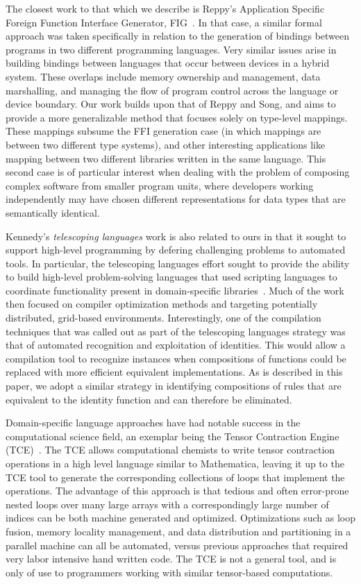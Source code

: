 The closest work to that which we describe is Reppy's Application
Specific Foreign Function Interface Generator,
FIG~\cite{reppy06fig}. In that case, a similar formal approach was
taken specifically in relation to the generation of bindings between
programs in two different programming languages.  Very similar issues
arise in building bindings between languages that occur between
devices in a hybrid system.  These overlaps include memory ownership
and management, data marshalling, and managing the flow of program
control across the language or device boundary.  Our work builds upon
that of Reppy and Song, and aims to provide a more generalizable
method that focuses solely on type-level mappings. These mappings
subsume the FFI generation case (in which mappings are between two
different type systems), and other interesting applications like
mapping between two different libraries written in the same
language. This second case is of particular interest when dealing with
the problem of composing complex software from smaller program units,
where developers working independently may have chosen different
representations for data types that are semantically identical.

Kennedy's \emph{telescoping languages} work is also related to ours in
that it sought to support high-level programming by defering
challenging problems to automated tools.  In particular, the
telescoping languages effort sought to provide the ability to build
high-level problem-solving languages that used scripting languages to
coordinate functionality present in domain-specific
libraries~\cite{kennedy00telescoping}. Much of the work then focused
on compiler optimization methods and targeting potentially
distributed, grid-based environments. Interestingly, one of the
compilation techniques that was called out as part of the telescoping
languages strategy was that of automated recognition and exploitation
of identities. This would allow a compilation tool to recognize
instances when compositions of functions could be replaced with more
efficient equivalent implementations. As is described in this paper,
we adopt a similar strategy in identifying compositions of rules that
are equivalent to the identity function and can therefore be
eliminated.

Domain-specific language approaches have had notable success in the
computational science field, an exemplar being the Tensor Contraction
Engine (TCE)~\cite{baumgartner05synthesis}. The TCE allows
computational chemists to write tensor contraction operations in a
high level language similar to Mathematica, leaving it up to the TCE
tool to generate the corresponding collections of loops that implement
the operations. The advantage of this approach is that tedious and
often error-prone nested loops over many large arrays with a
correspondingly large number of indices can be both machine generated
and optimized. Optimizations such as loop fusion, memory locality
management, and data distribution and partitioning in a parallel
machine can all be automated, versus previous approaches that required
very labor intensive hand written code. The TCE is not a general tool,
and is only of use to programmers working with similar tensor-based
computations.


